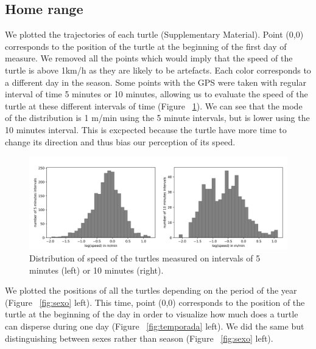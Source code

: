 \documentclass[10pt]{article}
\begin{document}
\subsection*{Home range}

We plotted the trajectories of each turtle (Supplementary Material). Point (0,0) corresponds to the position of the turtle at the beginning of the first day of measure. We removed all the points which would imply that the speed of the turtle is above 1km/h as they are likely to be artefacts. Each color corresponds to a different day in the season. Some points with the GPS were taken with regular interval of time 5 minutes or 10 minutes, allowing us to evaluate the speed of the turtle at these different intervals of time (Figure ~\ref{fig:speed}). We can see that the mode of the distribution is 1 m/min using the 5 minute intervals, but is lower using the 10 minutes interval. This is excpected because the turtle have more time to change its direction and thus bias our perception of its speed.

\begin{figure}[!ht]
\centering
\includegraphics[width=0.9\columnwidth]{speed_distribution_5m.png}
\caption{Distribution of speed of the turtles measured on intervals of 5 minutes (left) or 10 minutes (right).}
\label{fig:speed}
\end{figure}

We plotted the positions of all the turtles depending on the period of the year (Figure ~\ref{fig:sexo} left). This time, point (0,0) corresponds to the position of the turtle at the beginning of the day in order to visualize how much does a turtle can disperse during one day (Figure ~\ref{fig:temporada} left). We did the same but distinguishing between sexes rather than season (Figure ~\ref{fig:sexo} left).
\end{document}
